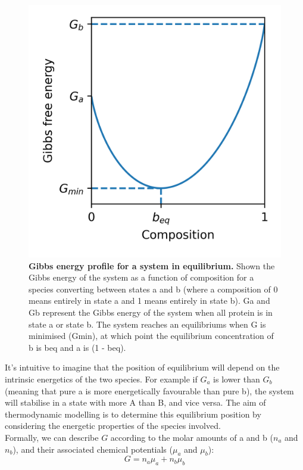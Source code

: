 \documentclass[12pt]{"report"}
\newcommand{\mycaption}[2]{\caption[#1]{\textbf{#1.} #2}}
\begin{document}
\begin{figure}
\includegraphics[scale=0.9]{gibbs_profile}
\mycaption{Gibbs energy profile for a system in equilibrium}{Shown the Gibbs energy of the system as a function of composition for a species converting between states a and b (where a composition of 0 means entirely in state a and 1 means entirely in state b). Ga and Gb represent the Gibbs energy of the system when all protein is in state a or state b. The system reaches an equilibriums when G is minimised (Gmin), at which point the equilibrium concentration of b is beq and a is (1 - beq).
}
\label{fig:gibbs_profile}
\end{figure}

It's intuitive to imagine that the position of equilibrium will depend on the intrinsic energetics of the two species. For example if $G_a$ is lower than $G_b$ (meaning that pure a is more energetically favourable than pure b), the system will stabilise in a state with more A than B, and vice versa. The aim of thermodynamic modelling is to determine this equilibrium position by considering the energetic properties of the species involved.\\

Formally, we can describe $G$ according to the molar amounts of a and b ($n_a$ and $n_b$), and their associated chemical potentials ($\mu_a$ and $\mu_b$):
\begin{equation}
G = n_a \mu_a + n_b \mu_b
\end{equation}
\end{document}
